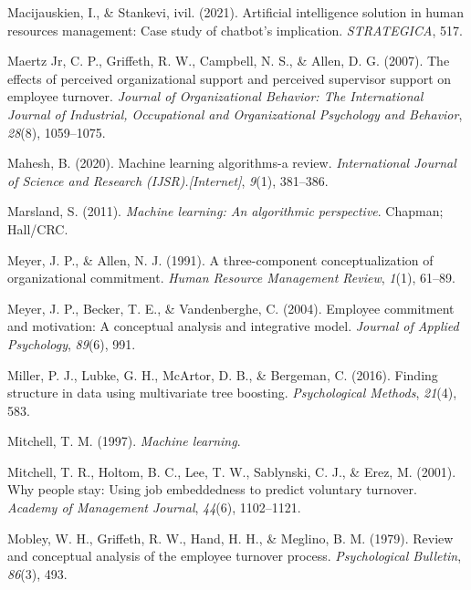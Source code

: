 \documentclass[
  man]{apa7}
\newlength{\cslhangindent}
\newenvironment{CSLReferences}[2] %
 {\begin{list}{}{%
  \setlength{\itemindent}{0pt}
  \setlength{\leftmargin}{0pt}
  \setlength{\parsep}{0pt}
  \ifodd #1
   \setlength{\leftmargin}{\cslhangindent}
   \setlength{\itemindent}{-1\cslhangindent}
  \fi
  \setlength{\itemsep}{#2\baselineskip}}}
 {\end{list}}
\begin{document}
\begin{CSLReferences}{1}{0}
Macijauskien, I., \& Stankevi, ivil. (2021). Artificial intelligence solution in human resources management: Case study of chatbot's implication. \emph{STRATEGICA}, 517.

Maertz Jr, C. P., Griffeth, R. W., Campbell, N. S., \& Allen, D. G. (2007). The effects of perceived organizational support and perceived supervisor support on employee turnover. \emph{Journal of Organizational Behavior: The International Journal of Industrial, Occupational and Organizational Psychology and Behavior}, \emph{28}(8), 1059--1075.

Mahesh, B. (2020). Machine learning algorithms-a review. \emph{International Journal of Science and Research (IJSR).{[}Internet{]}}, \emph{9}(1), 381--386.

Marsland, S. (2011). \emph{Machine learning: An algorithmic perspective}. Chapman; Hall/CRC.

Meyer, J. P., \& Allen, N. J. (1991). A three-component conceptualization of organizational commitment. \emph{Human Resource Management Review}, \emph{1}(1), 61--89.

Meyer, J. P., Becker, T. E., \& Vandenberghe, C. (2004). Employee commitment and motivation: A conceptual analysis and integrative model. \emph{Journal of Applied Psychology}, \emph{89}(6), 991.

Miller, P. J., Lubke, G. H., McArtor, D. B., \& Bergeman, C. (2016). Finding structure in data using multivariate tree boosting. \emph{Psychological Methods}, \emph{21}(4), 583.

Mitchell, T. M. (1997). \emph{Machine learning}.

Mitchell, T. R., Holtom, B. C., Lee, T. W., Sablynski, C. J., \& Erez, M. (2001). Why people stay: Using job embeddedness to predict voluntary turnover. \emph{Academy of Management Journal}, \emph{44}(6), 1102--1121.

Mobley, W. H., Griffeth, R. W., Hand, H. H., \& Meglino, B. M. (1979). Review and conceptual analysis of the employee turnover process. \emph{Psychological Bulletin}, \emph{86}(3), 493.


\end{CSLReferences}
\end{document}
